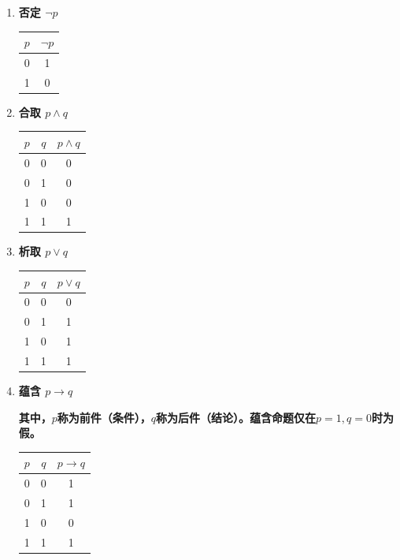 \begin{enumerate}
	
	\item \textbf{否定 $\neg p$}
	\begin{center}
		\begin{tabular}{|c|c|}
			\hline
			$p$ & $\neg p$ \\
			\hline
			0 & 1 \\
			1 & 0 \\
			\hline
		\end{tabular}
	\end{center}
	
	\item \textbf{合取 $p\land q$}
	\begin{center}
		\begin{tabular}{|c|c|c|}
			\hline
			$p$ & $q$ & $p\land q$ \\
			\hline
			0 & 0 & 0 \\
			0 & 1 & 0 \\
			1 & 0 & 0 \\
			1 & 1 & 1 \\
			\hline
		\end{tabular}
	\end{center}
	
	\item \textbf{析取 $p\lor q$}
	\begin{center}
		\begin{tabular}{|c|c|c|}
			\hline
			$p$ & $q$ & $p\lor q$ \\
			\hline
			0 & 0 & 0 \\
			0 & 1 & 1 \\
			1 & 0 & 1 \\
			1 & 1 & 1 \\
			\hline
		\end{tabular}
	\end{center}
	
	
	\item \textbf{蕴含 $p\to q$}
	
	\textbf{其中，$p$称为\textbf{前件（条件）}，$q$称为\textbf{后件（结论）}。蕴含命题仅在$p=1,q=0$时为假。}
	\begin{center}
		\begin{tabular}{|c|c|c|}
			\hline
			$p$ & $q$ & $p\to q$ \\
			\hline
			0 & 0 & 1 \\
			0 & 1 & 1 \\
			1 & 0 & 0 \\
			1 & 1 & 1 \\
			\hline
		\end{tabular}
	\end{center}
	

\end{enumerate}
